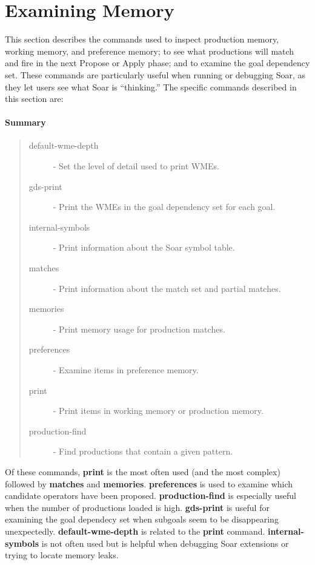 \section{Examining Memory}
\label{MEMORY}

This section describes the commands used to inspect production memory,
working memory, and preference memory; to see what productions will 
match and fire in the next Propose or Apply phase;  and to examine the 
goal dependency set.  These commands are particularly useful when
running or debugging Soar, as they let users see what Soar is ``thinking.''
The specific commands described in this section are:

\paragraph{Summary}
\begin{quote}
\begin{description}
\item[default-wme-depth] - Set the level of detail used to print WMEs.
\item[gds-print] - Print the WMEs in the goal dependency set for each goal.
\item[internal-symbols] - Print information about the Soar symbol table.
\item[matches] - Print information about the match set and partial matches.
\item[memories] - Print memory usage for production matches.
\item[preferences] - Examine items in preference memory.
\item[print] - Print items in working memory or production memory.
\item[production-find] - Find productions that contain a given pattern.
\end{description}
\end{quote}

Of these commands, \textbf{print} is the most often used (and the most
complex) followed by \textbf{matches} and \textbf{memories}.  \textbf{preferences}
is used to examine which candidate operators have been proposed.
\textbf{production-find} is especially useful when the number of
productions loaded is high.  \textbf{gds-print}
is useful for examining the goal dependecy set when subgoals seem to
be disappearing unexpectedly.  \textbf{default-wme-depth} is related to the \textbf{print} command.
\textbf{internal-symbols} is not often used but is helpful when debugging Soar extensions or
trying to locate memory leaks.

